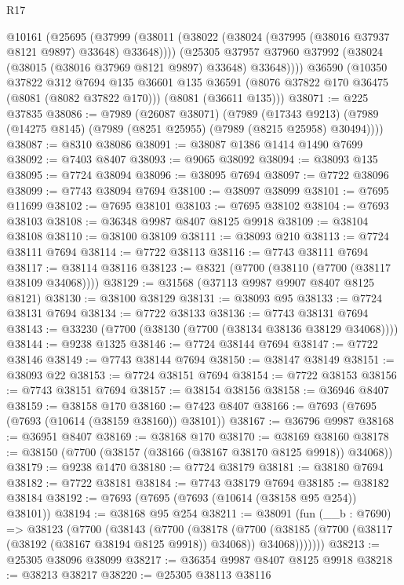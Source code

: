 \begin{lexlean}{R17}
\begin{coremodule}
    @10161
      (@25695
        (@37999 (@38011 (@38022 (@38024 (@37995 (@38016 @37937 @8121 @9897) @33648) @33648))))
        (@25305 @37957 @37960 @37992 (@38024 (@38015 (@38016 @37969 @8121 @9897) @33648) @33648))))
    @36590
    (@10350
      @37822
      @312
      @7694
      @135
      @36601
      @135
      @36591
      (@8076 @37822 @170 @36475 (@8081 (@8082 @37822 @170)))
      (@8081 (@36611 @135)))
@38071 := @225 @37835
@38086 := @7989
    (@26087 @38071)
    (@7989
      (@17343 @9213)
      (@7989 (@14275 @8145) (@7989 (@8251 @25955) (@7989 (@8215 @25958) @30494))))
@38087 := @8310 @38086
@38091 := @38087 @1386 @1414 @1490 @7699
@38092 := @7403 @8407
@38093 := @9065 @38092
@38094 := @38093 @135
@38095 := @7724 @38094
@38096 := @38095 @7694
@38097 := @7722 @38096
@38099 := @7743 @38094 @7694
@38100 := @38097 @38099
@38101 := @7695 @11699
@38102 := @7695 @38101
@38103 := @7695 @38102
@38104 := @7693 @38103
@38108 := @36348 @9987 @8407 @8125 @9918
@38109 := @38104 @38108
@38110 := @38100 @38109
@38111 := @38093 @210
@38113 := @7724 @38111 @7694
@38114 := @7722 @38113
@38116 := @7743 @38111 @7694
@38117 := @38114 @38116
@38123 := @8321 (@7700 (@38110 (@7700 (@38117 @38109 @34068))))
@38129 := @31568 (@37113 @9987 @9907 @8407 @8125 @8121)
@38130 := @38100 @38129
@38131 := @38093 @95
@38133 := @7724 @38131 @7694
@38134 := @7722 @38133
@38136 := @7743 @38131 @7694
@38143 := @33230 (@7700 (@38130 (@7700 (@38134 @38136 @38129 @34068))))
@38144 := @9238 @1325
@38146 := @7724 @38144 @7694
@38147 := @7722 @38146
@38149 := @7743 @38144 @7694
@38150 := @38147 @38149
@38151 := @38093 @22
@38153 := @7724 @38151 @7694
@38154 := @7722 @38153
@38156 := @7743 @38151 @7694
@38157 := @38154 @38156
@38158 := @36946 @8407
@38159 := @38158 @170
@38160 := @7423 @8407
@38166 := @7693 (@7695 (@7693 (@10614 (@38159 @38160)) @38101))
@38167 := @36796 @9987
@38168 := @36951 @8407
@38169 := @38168 @170
@38170 := @38169 @38160
@38178 := @38150 (@7700 (@38157 (@38166 (@38167 @38170 @8125 @9918)) @34068))
@38179 := @9238 @1470
@38180 := @7724 @38179
@38181 := @38180 @7694
@38182 := @7722 @38181
@38184 := @7743 @38179 @7694
@38185 := @38182 @38184
@38192 := @7693 (@7695 (@7693 (@10614 (@38158 @95 @254)) @38101))
@38194 := @38168 @95 @254
@38211 := @38091
    (fun (__b : @7690) =>
    @38123
      (@7700
        (@38143
          (@7700
            (@38178
              (@7700
                (@38185 (@7700 (@38117 (@38192 (@38167 @38194 @8125 @9918)) @34068)) @34068)))))))
@38213 := @25305 @38096 @38099
@38217 := @36354 @9987 @8407 @8125 @9918
@38218 := @38213 @38217
@38220 := @25305 @38113 @38116

\end{coremodule}
\end{lexlean}

